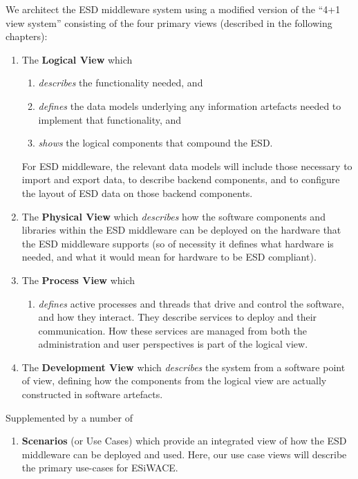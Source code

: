 We architect the ESD middleware system using a modified version of the ``4+1 view system'' \cite{philippe_kruchten_architectural_1995} consisting of the four primary views (described in the
following chapters):
\begin{enumerate}
    \item The \textbf{Logical View} which
    \begin{enumerate}
        \item \textit{describes} the functionality needed, and
        \item \textit{defines} the data models underlying any information artefacts needed to implement that functionality, and
        \item \textit{shows} the logical components that compound the ESD.
    \end{enumerate}
    For ESD middleware, the relevant data models will include those necessary to import and export data, to describe backend components, and to configure the layout of ESD data on those backend components.
    \item The \textbf{Physical View} which \textit{describes} how the software components and libraries within the ESD middleware can be deployed on the hardware that the ESD middleware supports (so of necessity it defines what hardware is needed, and what it would mean for hardware to be ESD compliant).
    \item The \textbf{Process View} which
    \begin{enumerate}
    \item \textit{defines} active processes and threads that drive and control the software, and how they interact.  They describe services to deploy and their communication.
    How these services are managed from both the administration and user perspectives is part of the logical view.
    \end{enumerate}
    \item The \textbf{Development View} which \textit{describes} the system from a software point of view, defining how the components from the logical view are actually constructed in software artefacts.
\end{enumerate}
Supplemented by a number of
\begin{enumerate} [resume]
    \item \textbf{Scenarios} (or Use Cases) which provide an integrated view of how the ESD middleware can be deployed and used. Here, our use case views will describe the primary use-cases for ESiWACE.
\end{enumerate}
